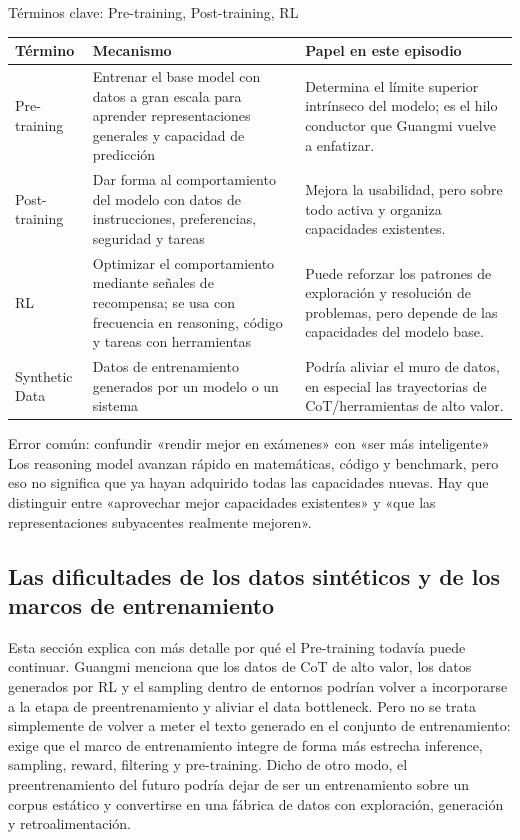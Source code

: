 \documentclass[a4paper]{article}
\begin{document}
\begin{knowledgebox}{Términos clave: Pre-training, Post-training, RL}
\noindent\begin{tabularx}{\textwidth}{p{}p{}X}
\toprule
Término & Mecanismo & Papel en este episodio \\
\midrule
Pre-training & Entrenar el base model con datos a gran escala para aprender representaciones generales y capacidad de predicción & Determina el límite superior intrínseco del modelo; es el hilo conductor que Guangmi vuelve a enfatizar. \\
Post-training & Dar forma al comportamiento del modelo con datos de instrucciones, preferencias, seguridad y tareas & Mejora la usabilidad, pero sobre todo activa y organiza capacidades existentes. \\
RL & Optimizar el comportamiento mediante señales de recompensa; se usa con frecuencia en reasoning, código y tareas con herramientas & Puede reforzar los patrones de exploración y resolución de problemas, pero depende de las capacidades del modelo base. \\
Synthetic Data & Datos de entrenamiento generados por un modelo o un sistema & Podría aliviar el muro de datos, en especial las trayectorias de CoT/herramientas de alto valor. \\
\bottomrule
\end{tabularx}
\end{knowledgebox}

\begin{warningbox}{Error común: confundir «rendir mejor en exámenes» con «ser más inteligente»}
Los reasoning model avanzan rápido en matemáticas, código y benchmark, pero eso no significa que ya hayan adquirido todas las capacidades nuevas. Hay que distinguir entre «aprovechar mejor capacidades existentes» y «que las representaciones subyacentes realmente mejoren».
\end{warningbox}

\subsection{Las dificultades de los datos sintéticos y de los marcos de entrenamiento}

Esta sección explica con más detalle por qué el Pre-training todavía puede continuar. Guangmi menciona que los datos de CoT de alto valor, los datos generados por RL y el sampling dentro de entornos podrían volver a incorporarse a la etapa de preentrenamiento y aliviar el data bottleneck. Pero no se trata simplemente de volver a meter el texto generado en el conjunto de entrenamiento: exige que el marco de entrenamiento integre de forma más estrecha inference, sampling, reward, filtering y pre-training. Dicho de otro modo, el preentrenamiento del futuro podría dejar de ser un entrenamiento sobre un corpus estático y convertirse en una fábrica de datos con exploración, generación y retroalimentación.
\end{document}
